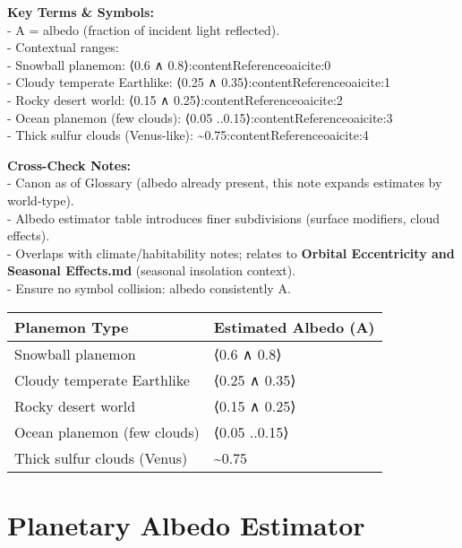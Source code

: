 \documentclass[
  letterpaper,
]{book}
\begin{document}
\textbf{Key Terms \& Symbols:}\\
- A = albedo (fraction of incident light reflected).\\
- Contextual ranges:\\
- Snowball planemon: ⟨0.6 ∧ 0.8⟩:contentReference{oaicite:0}\\
- Cloudy temperate Earthlike: ⟨0.25 ∧
0.35⟩:contentReference{oaicite:1}\\
- Rocky desert world: ⟨0.15 ∧ 0.25⟩:contentReference{oaicite:2}\\
- Ocean planemon (few clouds): ⟨0.05
..0.15⟩:contentReference{oaicite:3}\\
- Thick sulfur clouds (Venus-like):
\textasciitilde0.75:contentReference{oaicite:4}

\textbf{Cross-Check Notes:}\\
- Canon as of Glossary (albedo already present, this note expands
estimates by world-type).\\
- Albedo estimator table introduces finer subdivisions (surface
modifiers, cloud effects).\\
- Overlaps with climate/habitability notes; relates to \textbf{Orbital
Eccentricity and Seasonal Effects.md} (seasonal insolation context).\\
- Ensure no symbol collision: albedo consistently A.

\begin{longtable}[]{@{}ll@{}}
\toprule\noalign{}
Planemon Type & Estimated Albedo (A) \\
\midrule\noalign{}
\endhead
\bottomrule\noalign{}
\endlastfoot
Snowball planemon & ⟨0.6 ∧ 0.8⟩ \\
Cloudy temperate Earthlike & ⟨0.25 ∧ 0.35⟩ \\
Rocky desert world & ⟨0.15 ∧ 0.25⟩ \\
Ocean planemon (few clouds) & ⟨0.05 ..0.15⟩ \\
Thick sulfur clouds (Venus) & \textasciitilde0.75 \\
\end{longtable}

\chapter{Planetary Albedo Estimator}\label{planetary-albedo-estimator}
\end{document}
